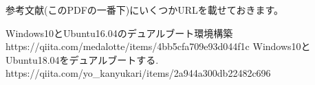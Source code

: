 \documentclass[11pt,a4paper]{jsarticle}
\begin{document}
\color{black}

参考文献(このPDFの一番下)にいくつかURLを載せておきます。


%


\begin{thebibliography}{99}
 Windows10とUbuntu16.04のデュアルブート環境構築\\https://qiita.com/medalotte/items/4bb5cfa709e93d044f1c
 Windows10とUbuntu18.04をデュアルブートする.\\https://qiita.com/yo\_kanyukari/items/2a944a300db22482c696
\end{thebibliography}%
%
\end{document}
